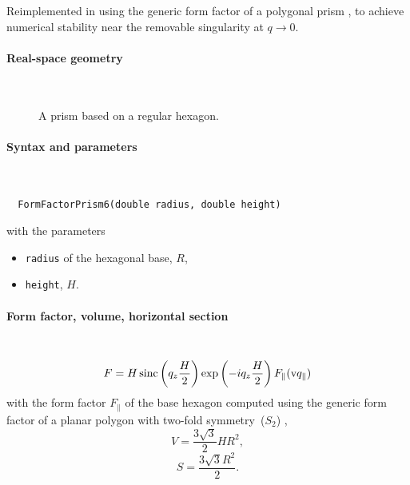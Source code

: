 Reimplemented in  using the generic form factor
of a polygonal prism \cite{Wut17},
to achieve numerical stability near the removable singularity at $q\to0$.

 \label{SPrism6}

\paragraph{Real-space geometry}\strut\\

\begin{figure}[H]
\hfill
{}
\hfill
{}
\hfill
{}
\hfill
\caption{A prism based on a regular hexagon.}
\end{figure}

\FloatBarrier

\paragraph{Syntax and parameters}\strut\\[-2ex plus .2ex minus .2ex]
\begin{lstlisting}
  FormFactorPrism6(double radius, double height)
\end{lstlisting}
with the parameters
\begin{itemize}
\item \texttt{radius} of the hexagonal base, $R$,
\item \texttt{height}, $H$.
\end{itemize}

\paragraph{Form factor, volume, horizontal section}\strut\\
\begin{equation*}
F = H \operatorname{sinc}\left(q_z\frac{H}{2}\right) \exp\left(-i q_z\frac{ H}{2}\right) F_\parallel(\text{v}{q}_\parallel)
\end{equation*}
with the form factor $F_\parallel$ of the base hexagon
computed using the generic form factor of a planar polygon
with two-fold symmetry~($S_2$) \cite{Wut17},
\begin{equation*}
  V = \dfrac{3\sqrt{3}}{2}H R^2,
\end{equation*}
\begin{equation*}
  S =\dfrac{3\sqrt{3}R^2}{2}.
\end{equation*}

